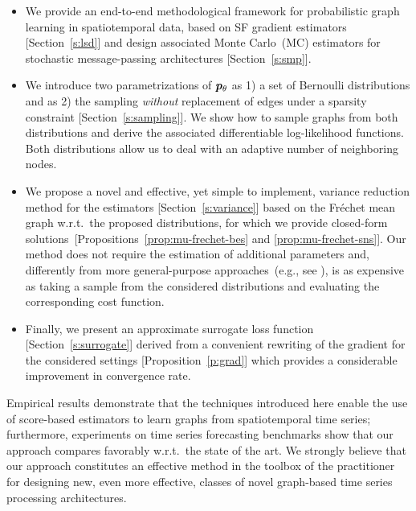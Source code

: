 \begin{itemize}

\item We provide an end-to-end methodological framework for probabilistic graph learning in spatiotemporal data, based on SF gradient estimators [Section~\ref{s:lsd}] and design associated Monte Carlo~(MC) estimators for stochastic message-passing architectures [Section~\ref{s:smp}].


\item We introduce two parametrizations of ${{\bm{p}}_\theta}$ as 1) a set of Bernoulli distributions and as 2) the sampling \emph{without} replacement of edges under a sparsity constraint [Section~\ref{s:sampling}]. We show how to sample graphs from both distributions and derive the associated differentiable log-likelihood functions. Both distributions allow us to deal with an adaptive number of neighboring nodes.


\item We propose a novel and effective, yet simple to implement, variance reduction method for the estimators [Section~\ref{s:variance}] based on the Fr\'echet mean graph w.r.t.\ the proposed distributions, for which we provide closed-form solutions~[Propositions~\ref{prop:mu-frechet-bes} and \ref{prop:mu-frechet-sns}].
Our method does not require the estimation of additional parameters and, differently from more general-purpose approaches~(e.g.,  see \citet{mnih2014neural}), is as expensive as taking a sample from the considered distributions and evaluating the corresponding cost function.

\item Finally, we present an approximate surrogate loss function [Section~\ref{s:surrogate}]  derived from a convenient rewriting of the gradient for the considered settings [Proposition~\ref{p:grad}] which provides a considerable improvement in convergence rate.

\end{itemize}

Empirical results demonstrate that the techniques introduced here enable the use of score-based estimators to learn graphs from spatiotemporal time series; furthermore, experiments on time series forecasting benchmarks show that our approach compares favorably w.r.t.\ the state of the art. We strongly believe that our approach constitutes an effective method in the toolbox of the practitioner for designing new, even more effective, classes of novel graph-based time series processing architectures. 
 
